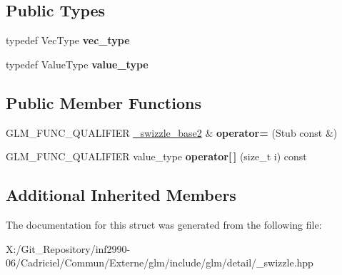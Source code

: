 \subsection*{Public Types}
\begin{DoxyCompactItemize}
\item 
\hypertarget{structglm_1_1detail_1_1__swizzle__base2_3_01_value_type_00_01_p_00_01_vec_type_00_01_n_00_01_e0_fc19218d69dc8988a4a57fbe7f79725c_aa478e9f198b8832d76245adde9c627ec}{typedef Vec\-Type {\bfseries vec\-\_\-type}}\label{structglm_1_1detail_1_1__swizzle__base2_3_01_value_type_00_01_p_00_01_vec_type_00_01_n_00_01_e0_fc19218d69dc8988a4a57fbe7f79725c_aa478e9f198b8832d76245adde9c627ec}

\item 
\hypertarget{structglm_1_1detail_1_1__swizzle__base2_3_01_value_type_00_01_p_00_01_vec_type_00_01_n_00_01_e0_fc19218d69dc8988a4a57fbe7f79725c_aea7ec681454787ad7a322c06aec98757}{typedef Value\-Type {\bfseries value\-\_\-type}}\label{structglm_1_1detail_1_1__swizzle__base2_3_01_value_type_00_01_p_00_01_vec_type_00_01_n_00_01_e0_fc19218d69dc8988a4a57fbe7f79725c_aea7ec681454787ad7a322c06aec98757}

\end{DoxyCompactItemize}
\subsection*{Public Member Functions}
\begin{DoxyCompactItemize}
\item 
\hypertarget{structglm_1_1detail_1_1__swizzle__base2_3_01_value_type_00_01_p_00_01_vec_type_00_01_n_00_01_e0_fc19218d69dc8988a4a57fbe7f79725c_aed2b7223090d020e28af46eb33fe6729}{G\-L\-M\-\_\-\-F\-U\-N\-C\-\_\-\-Q\-U\-A\-L\-I\-F\-I\-E\-R \hyperlink{structglm_1_1detail_1_1__swizzle__base2}{\-\_\-swizzle\-\_\-base2} \& {\bfseries operator=} (Stub const \&)}\label{structglm_1_1detail_1_1__swizzle__base2_3_01_value_type_00_01_p_00_01_vec_type_00_01_n_00_01_e0_fc19218d69dc8988a4a57fbe7f79725c_aed2b7223090d020e28af46eb33fe6729}

\item 
\hypertarget{structglm_1_1detail_1_1__swizzle__base2_3_01_value_type_00_01_p_00_01_vec_type_00_01_n_00_01_e0_fc19218d69dc8988a4a57fbe7f79725c_a2f3a45edbb24ca7e12182c3123dde632}{G\-L\-M\-\_\-\-F\-U\-N\-C\-\_\-\-Q\-U\-A\-L\-I\-F\-I\-E\-R value\-\_\-type {\bfseries operator\mbox{[}$\,$\mbox{]}} (size\-\_\-t i) const }\label{structglm_1_1detail_1_1__swizzle__base2_3_01_value_type_00_01_p_00_01_vec_type_00_01_n_00_01_e0_fc19218d69dc8988a4a57fbe7f79725c_a2f3a45edbb24ca7e12182c3123dde632}

\end{DoxyCompactItemize}
\subsection*{Additional Inherited Members}


The documentation for this struct was generated from the following file\-:\begin{DoxyCompactItemize}
\item 
X\-:/\-Git\-\_\-\-Repository/inf2990-\/06/\-Cadriciel/\-Commun/\-Externe/glm/include/glm/detail/\-\_\-swizzle.\-hpp\end{DoxyCompactItemize}
